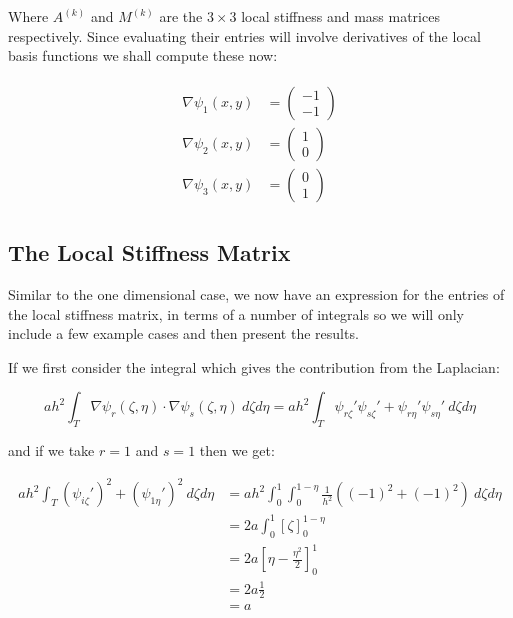 Where $A^{(k)}$ and $M^{(k)}$ are the $3 \times 3$ local stiffness and mass
matrices respectively. Since evaluating their entries will involve derivatives
of the local basis functions we shall compute these now:

\begin{align}
    \begin{split}
        \nabla\psi_1(x, y) &= \left(\begin{array}{c} -1 \\ -1 \end{array}\right) \\
        \nabla\psi_2(x, y) &= \left(\begin{array}{c} 1 \\ 0 \end{array}\right) \\
        \nabla\psi_3(x, y) &= \left(\begin{array}{c} 0 \\ 1 \end{array}\right)
    \end{split}
\end{align}

\subsection{The Local Stiffness Matrix}

Similar to the one dimensional case, we now have an expression for the entries
of the local stiffness matrix, in terms of a number of integrals
 so we will only include a few
example cases and then present the results.

If we first consider the integral which gives the contribution from the
Laplacian:

\begin{equation*}
    ah^2\int_T\nabla\psi_r(\zeta,\eta)\cdot\nabla\psi_s(\zeta,\eta)\ d\zeta d\eta =
    ah^2\int_T\psi_{r\zeta}'\psi_{s\zeta}' + \psi_{r\eta}'\psi_{s\eta}'\ d\zeta d\eta
\end{equation*}

and if we take $r = 1$ and $s = 1$ then we get:

\begin{align*}
    ah^2\int_T(\psi_{i\zeta}')^2 + (\psi_{1\eta}')^2\ d\zeta d\eta
    &= ah^2\int_0^1\int_0^{1 - \eta}\frac{1}{h^2}((-1)^2 + (-1)^2)\ d\zeta d\eta \\
    &= 2a\int_0^1\left[\zeta\right]_0^{1 - \eta} \\
    &= 2a\left[\eta - \frac{\eta^2}{2}\right]_0^1 \\
    &= 2a\frac{1}{2} \\
    &= a
\end{align*}

